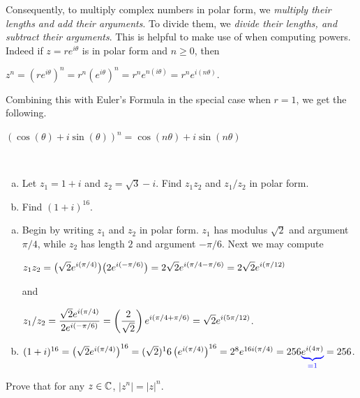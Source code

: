\documentclass[11pt,fleqn,dvipsnames,usenames]{article}
\newcommand{\p}{\noindent}
\begin{document}
\p Consequently, to multiply complex numbers in polar form, we \emph{multiply their lengths and add their arguments}.  To divide them, we \emph{divide their lengths, and subtract their arguments}.  This is helpful to make use of when computing powers.  Indeed if $z = re^{i\theta}$ is in polar form and $n\geq 0$, then
\begin{center}
$z^{n} = \left(re^{i\theta}\right)^{n} = r^{n}\left(e^{i\theta}\right)^{n} = r^{n}e^{n(i\theta)} = r^{n}e^{i(n\theta)}$.
\end{center}
\vsp

\p Combining this with Euler's Formula in the special case when $r = 1$, we get the following.

\begin{theorem} $(\cos(\theta) + i\sin(\theta))^{n} = \cos(n\theta) + i\sin(n\theta)$
\end{theorem}

\begin{examples}~
\begin{enumerate}[(a)]
\item Let $z_{1} = 1 + i$ and $z_{2}  = \sqrt{3} - i$.  Find $z_{1}z_{2}$ and $z_{1}/z_{2}$ in polar form.
\item Find $(1 + i)^{16}$.
\end{enumerate}
\end{examples}
%
\begin{solution}
\begin{enumerate}[(a)]
\item Begin by writing $z_{1}$ and $z_{2}$ in polar form.  $z_{1}$ has modulus $\sqrt{2}$ and argument $\pi/4$, while $z_{2}$ has length $2$ and argument $-\pi/6$.  Next we may compute
\begin{center}
$\displaystyle{z_{1}z_{2} = \big(\sqrt{2}e^{i(\pi/4)}\big)\big(2e^{i(-\pi/6)}\big) = 2\sqrt{2}e^{i(\pi/4-\pi/6)} = 2\sqrt{2}e^{i(\pi/12)}}$
\end{center}
and
\begin{center}
$\displaystyle{z_{1}/z_{2} = \frac{\sqrt{2}e^{i(\pi/4)}}{2e^{i(-\pi/6)}} = \left(\frac{2}{\sqrt{2}}\right)e^{i(\pi/4+\pi/6)} = \sqrt{2}e^{i(5\pi/12)}}$.
\end{center}
\item $(1+i)^{16} = \left(\sqrt{2}e^{i(\pi/4)}\right)^{16} = (\sqrt{2})^16\left(e^{i(\pi/4)}\right)^{16} = 2^{8}e^{16i(\pi/4)} = 256{\color{blue}\underbrace{{\color{black}e^{i(4\pi)}}}_{=1}} = 256$.
\end{enumerate}
\end{solution}
%
\begin{exercise}
Prove that for any $z\in\mathbb{C}$, $|z^{n}| = |z|^{n}$.
\end{exercise}
%
\end{document}
